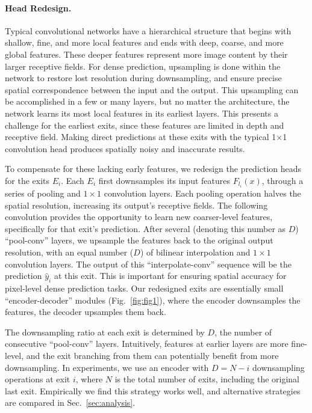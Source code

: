 \documentclass{article} %
\renewcommand{\cite}{\citep}
\begin{document}
\paragraph{Head Redesign.}
\label{sec:rh}
Typical convolutional networks have a hierarchical structure that begins with shallow, fine, and more local features and ends with deep, coarse, and more global features.
These deeper features represent more image content by their larger receptive fields.
For dense prediction, upsampling is done within the network to restore lost resolution during downsampling, and ensure precise spatial correspondence between the input and the output. 
This upsampling can be accomplished in a few \cite{long2015fully} or many \cite{zhao2017pyramid} layers, but no matter the architecture, the network learns its most local features in its earliest layers.
This presents a challenge for the earliest exits, since these features are limited in depth and receptive field.
Making direct predictions at these exits 
with the typical 1$\times$1 convolution head
produces spatially noisy and inaccurate results.

To compensate for these lacking early features, we redesign the prediction heads for the exits $E_i$.
Each $E_i$ first downsamples its input features $F_{l_i}(x)$, through a series of pooling and $1\times1$ convolution layers.
Each pooling operation halves the spatial resolution, increasing its output's receptive fields.
The following convolution provides the opportunity to learn new coarser-level features, specifically for that exit's prediction.  
After several (denoting this number as $D$) ``pool-conv'' layers, we upsample the features back to the original output resolution, with an equal number ($D$) of bilinear interpolation and $1\times1$ convolution layers.
The output of this ``interpolate-conv'' sequence will be the prediction $\hat{y}_i$ at this exit.
This is important for ensuring spatial accuracy for pixel-level dense prediction tasks.
Our redesigned exits are essentially small ``encoder-decoder'' modules (Fig.~\ref{fig:fig1}), where the encoder downsamples the features, the decoder upsamples them back.

The downsampling ratio at each exit is determined by $D$, the number of consecutive ``pool-conv'' layers.
Intuitively, features at earlier layers are more fine-level, and the exit branching from them can potentially benefit from more downsampling.
In experiments, we use an encoder with $D=N-i$ downsampling operations at exit $i$, where $N$ is the total number of exits, including the original last exit.
Empirically we find this strategy works well, and alternative strategies are compared in Sec.~\ref{sec:analysis}. 
\end{document}
